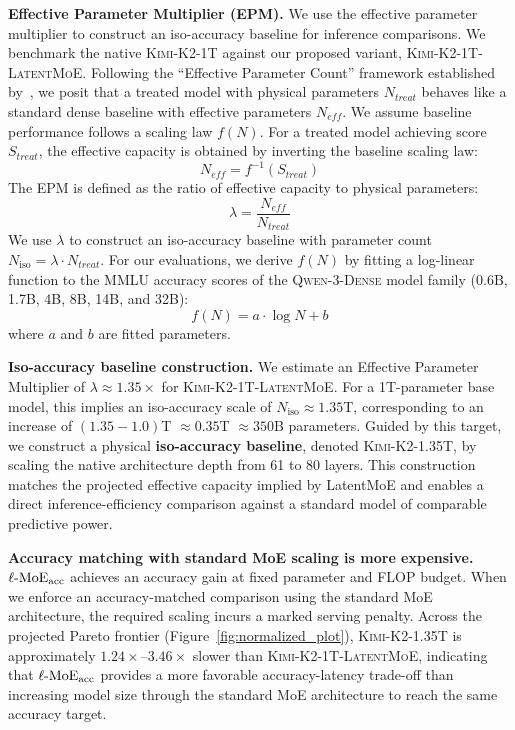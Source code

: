\noindent \textbf{Effective Parameter Multiplier (EPM).} We use the effective parameter multiplier to construct an iso-accuracy baseline for inference comparisons. We benchmark the native \textsc{Kimi-K2-1T} against our proposed variant, \textsc{Kimi-K2-1T-LatentMoE}. Following the ``Effective Parameter Count'' framework established by~\cite{frantar2025compressionscaling}, we posit that a treated model with physical parameters $N_{treat}$ behaves like a standard dense baseline with effective parameters $N_{eff}$. We assume baseline performance follows a scaling law $f(N)$. For a treated model achieving score $S_{treat}$, the effective capacity is obtained by inverting the baseline scaling law:
\begin{equation}
    N_{eff} = f^{-1}(S_{treat})
\end{equation}
The EPM is defined as the ratio of effective capacity to physical parameters:
\begin{equation}
    \lambda = \frac{N_{eff}}{N_{treat}}
\end{equation}
We use $\lambda$ to construct an iso-accuracy baseline with parameter count $N_{\text{iso}} = \lambda \cdot N_{treat}$. For our evaluations, we derive $f(N)$ by fitting a log-linear function to the MMLU accuracy scores of the \textsc{Qwen-3-Dense} model family (0.6B, 1.7B, 4B, 8B, 14B, and 32B):
\begin{equation}
    f(N) = a \cdot \log N + b
\end{equation}
where $a$ and $b$ are fitted parameters.

\noindent \textbf{Iso-accuracy baseline construction.} We estimate an Effective Parameter Multiplier of $\lambda \approx 1.35\times$ for \textsc{Kimi-K2-1T-LatentMoE}. For a 1T-parameter base model, this implies an iso-accuracy scale of $N_{\text{iso}} \approx 1.35$T, corresponding to an increase of $(1.35 - 1.0)$T $\approx 0.35$T $\approx 350$B parameters. Guided by this target, we construct a physical \textbf{iso-accuracy baseline}, denoted \textsc{Kimi-K2-1.35T}, by scaling the native architecture depth from 61 to 80 layers. This construction matches the projected effective capacity implied by LatentMoE and enables a direct inference-efficiency comparison against a standard model of comparable predictive power.

\noindent \textbf{Accuracy matching with standard MoE scaling is more expensive.} $\operatorname{\ell-MoE}_\mathrm{acc}$ achieves an accuracy gain at fixed parameter and FLOP budget. When we enforce an accuracy-matched comparison using the standard MoE architecture, the required scaling incurs a marked serving penalty. Across the projected Pareto frontier (Figure~\ref{fig:normalized_plot}), \textsc{Kimi-K2-1.35T} is approximately $1.24\times$--$3.46\times$ slower than \textsc{Kimi-K2-1T-LatentMoE}, indicating that $\operatorname{\ell-MoE}_\mathrm{acc}$ provides a more favorable accuracy-latency trade-off than increasing model size through the standard MoE architecture to reach the same accuracy target.

